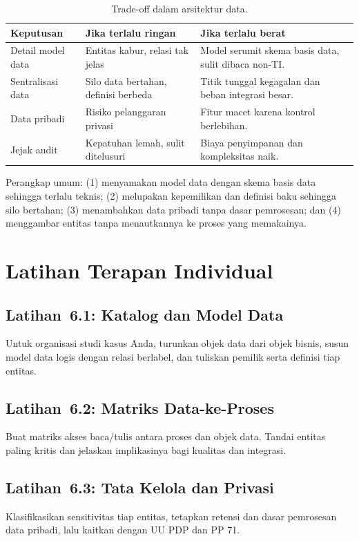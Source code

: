 \begin{table}[htbp]
\centering
\scriptsize
\caption{Trade-off dalam arsitektur data.}
\label{tab:tradeoff-bab5-data}
\begin{tabularx}{\textwidth}{@{}p{} X X@{}}
\hline
\textbf{Keputusan} & \textbf{Jika terlalu ringan} & \textbf{Jika terlalu berat} \\
\hline
Detail model data & Entitas kabur, relasi tak jelas & Model serumit skema basis
data, sulit dibaca non-TI. \\
Sentralisasi data & Silo data bertahan, definisi berbeda & Titik tunggal
kegagalan dan beban integrasi besar. \\
Data pribadi & Risiko pelanggaran privasi & Fitur macet karena kontrol
berlebihan. \\
Jejak audit & Kepatuhan lemah, sulit ditelusuri & Biaya penyimpanan dan
kompleksitas naik. \\
\hline
\end{tabularx}
\end{table}

Perangkap umum: (1) menyamakan model data dengan skema basis data sehingga terlalu
teknis; (2) melupakan kepemilikan dan definisi baku sehingga silo bertahan; (3)
menambahkan data pribadi tanpa dasar pemrosesan; dan (4) menggambar entitas tanpa
menautkannya ke proses yang memakainya.

\section{Latihan Terapan Individual}

\subsection*{Latihan~6.1: Katalog dan Model Data}
Untuk organisasi studi kasus Anda, turunkan objek data dari objek bisnis, susun
model data logis dengan relasi berlabel, dan tuliskan pemilik serta definisi tiap
entitas.

\subsection*{Latihan~6.2: Matriks Data-ke-Proses}
Buat matriks akses baca/tulis antara proses dan objek data. Tandai entitas paling
kritis dan jelaskan implikasinya bagi kualitas dan integrasi.

\subsection*{Latihan~6.3: Tata Kelola dan Privasi}
Klasifikasikan sensitivitas tiap entitas, tetapkan retensi dan dasar pemrosesan
data pribadi, lalu kaitkan dengan UU PDP dan PP 71.

